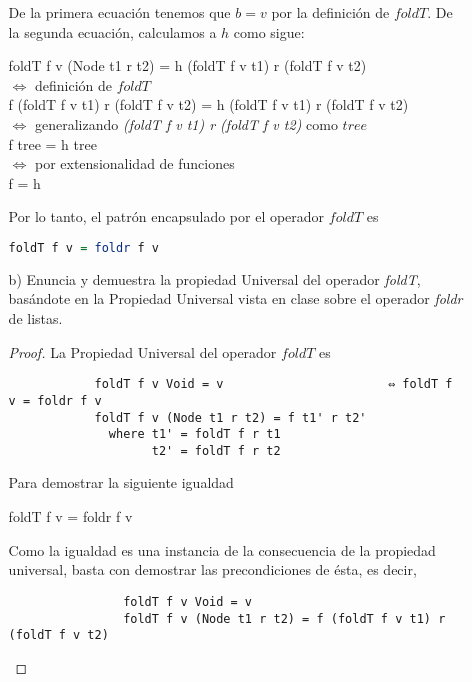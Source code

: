 \documentclass[letterpaper,11pt]{article}
\begin{document}
\begin{enumerate}
\begin{itemize}
        De la primera ecuación tenemos que $b = v$ por la definición de 
        $foldT$. De la segunda ecuación, calculamos a $h$ como sigue:
        \begin{center}
            foldT f v (Node t1 r t2) = h (foldT f v t1) r (foldT f v t2) \\
            $\Leftrightarrow$ definición de $foldT$ \\
            f (foldT f v t1) r (foldT f v t2) = 
            h (foldT f v t1) r (foldT f v t2) \\
            $\Leftrightarrow$ generalizando \textit{(foldT f v t1) r 
            (foldT f v t2)} como $tree$ \\
            f tree = h tree \\
            $\Leftrightarrow$ por extensionalidad de funciones \\
            f = h
        \end{center}
        
        Por lo tanto, el patrón encapsulado por el operador $foldT$ es 
        \begin{lstlisting}[language=Haskell]
            foldT f v = foldr f v
        \end{lstlisting}
        
        \item[b)] Enuncia y demuestra la propiedad Universal del operador 
        \textit{foldT}, basándote en la Propiedad Universal vista en clase
        sobre el operador \textit{foldr} de listas.
        
        \begin{proof}
            La Propiedad Universal del operador $foldT$ es
            \begin{verbatim}
            foldT f v Void = v                       ⇔ foldT f v = foldr f v
            foldT f v (Node t1 r t2) = f t1' r t2'
              where t1' = foldT f r t1
                    t2' = foldT f r t2            
            \end{verbatim}
            
            Para demostrar la siguiente igualdad
            \begin{center}
                foldT f v = foldr f v
            \end{center}
            
            Como la igualdad es una instancia de la consecuencia de la propiedad
            universal, basta con demostrar las precondiciones de ésta, es decir,
            \begin{lstlisting}
                foldT f v Void = v
                foldT f v (Node t1 r t2) = f (foldT f v t1) r (foldT f v t2) 
            \end{lstlisting}
            

\end{proof}
\end{itemize}
\end{enumerate}
\end{document}
